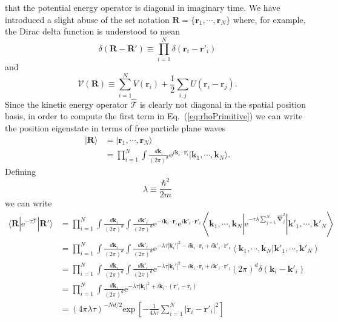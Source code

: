 \documentclass[prb,10pt,aps,floatfix,notitlepage]{revtex4-1}
\renewcommand{\vec}[1]{\boldsymbol{#1}}
\newcommand{\e}[1]{\mathrm{e}^{#1}}
\renewcommand{\eqref}[1]{Eq.~(\ref{#1})}
\newcommand{\R}{\vec{R}}
\newcommand{\T}{\mathcal{T}}
\begin{document}
that the potential energy operator is diagonal in imaginary time. We have
introduced a slight abuse of the set notation
$\R = \{\vec{r}_1, \cdots, \vec{r}_N \}$ where, for example, the Dirac delta
function is understood to mean
%
\begin{equation}
    \delta(\R-\R') \equiv \prod_{i=1}^{N}\delta(\vec{r}_i-\vec{r}'_i)
\end{equation}
%
and 
%
\begin{equation}
    \mathcal{V}(\R) \equiv \sum_{i=1}^N V(\vec{r}_i) + \frac{1}{2}\sum_{i,j}
U(\vec{r}_i-\vec{r}_j).
\end{equation}
%
Since the kinetic energy operator $\hat{\T}$ is clearly not diagonal in the
spatial position basis, in order to compute the first term in
\eqref{eq:rhoPrimitive} we can write the position eigenstate in terms of free
particle plane waves
%
\begin{align}
    |\R \rangle &=  | \vec{r}_1, \cdots, \vec{r}_N \rangle \nonumber \\
                &= \prod_{i=1}^N \int \frac{d\vec{k}_i}{(2\pi)^d} 
    \e{i \vec{k}_i \cdot \vec{r}_i} | \vec{k}_1, \cdots, \vec{k}_N\rangle.
\end{align}
%
Defining
%
\begin{equation}
    \lambda \equiv \frac{\hbar^2}{2 m}
\end{equation}
%
we can write
%
\begin{align}
    \langle \R | \e{-\tau\hat{\T}}|\R'\rangle &= \prod_{i=1}^N 
    \int \frac{d\vec{k}_i}{(2\pi)^d} \int \frac{d\vec{k}'_i}{(2\pi)^d} 
    \e{-i \vec{k}_i \cdot \vec{r}_i} \e{i \vec{k}'_i \cdot \vec{r}'_i} 
    \left \langle \vec{k}_1, \cdots, \vec{k}_N \left | \e{-\tau \lambda
\sum_{j=1}^N\hat{\vec{\nabla}}_j^2} \right | \vec{k}'_1, \cdots, \vec{k}'_N
\right \rangle \nonumber \\
&= \prod_{i=1}^N\int \frac{d\vec{k}_i}{(2\pi)^d} \int \frac{d\vec{k}'_i}{(2\pi)^d} 
\e{-\lambda \tau |\vec{k}_i'|^2 - i \vec{k}_i \cdot \vec{r}_i + i \vec{k}'_i \cdot
\vec{r}'_i} \left \langle \vec{k}_1, \cdots, \vec{k}_N | \vec{k}'_1, \cdots,
\vec{k}'_N \right \rangle \nonumber \\
&= \prod_{i=1}^N\int \frac{d\vec{k}_i}{(2\pi)^d} \int \frac{d\vec{k}'_i}{(2\pi)^d} 
\e{-\lambda \tau |\vec{k}_i'|^2 - i \vec{k}_i \cdot \vec{r}_i + i \vec{k}'_i \cdot
\vec{r}'_i}  (2\pi)^d \delta(\vec{k}_i-\vec{k}'_i) \nonumber \\
&= \prod_{i=1}^N\int \frac{d\vec{k}_i}{(2\pi)^d} 
\e{-\lambda \tau |\vec{k}_i|^2 + i \vec{k}_i \cdot (\vec{r}'_i - \vec{r}_i)}  
\nonumber \\
&= (4\pi \lambda \tau)^{-Nd/2} \mathrm{exp}\,\left[ -\frac{1}{4\lambda
\tau} \sum_{i=1}^N | \vec{r}_i-\vec{r}'_i|^2 \right] 
\end{align}
\end{document}
